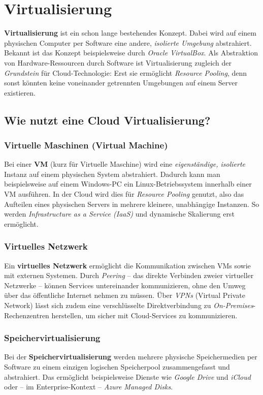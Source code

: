 \section{Virtualisierung}
\textbf{Virtualisierung} ist ein schon lange bestehendes Konzept. Dabei wird auf einem
physischen Computer per Software eine andere, \emph{isolierte Umgebung} abstrahiert.
Bekannt ist das Konzept beispielsweise durch \textit{Oracle VirtualBox}. Als Abstraktion
von Hardware-Ressourcen durch Software ist Virtualisierung zugleich der
\emph{Grundstein} für Cloud-Technologie: Erst sie ermöglicht \textit{Resource Pooling}, denn
sonst könnten keine voneinander getrennten Umgebungen auf einem Server
existieren.
\subsection{Wie nutzt eine Cloud Virtualisierung?}
\subsubsection{Virtuelle Maschinen (Virtual Machine)}
Bei einer \textbf{VM} (kurz für Virtuelle Maschine) wird eine \emph{eigenständige, isolierte}
Instanz auf einem physischen System abstrahiert. Dadurch kann man
beispielsweise auf einem Windows-PC ein Linux-Betriebssystem innerhalb einer VM
ausführen. In der Cloud wird dies für \textit{Resource Pooling} genutzt, also das
Aufteilen eines physischen Servers in mehrere kleinere, unabhängige Instanzen.
So werden \textit{Infrastructure as a Service (IaaS)} und dynamische Skalierung erst
ermöglicht.
\subsubsection{Virtuelles Netzwerk}
Ein \textbf{virtuelles Netzwerk} ermöglicht die Kommunikation zwischen VMs sowie mit
externen Systemen. Durch \textit{Peering} – das direkte Verbinden zweier virtueller
Netzwerke – können Services untereinander kommunizieren, ohne den Umweg über
das öffentliche Internet nehmen zu müssen. Über \textit{VPNs} (Virtual Private Network)
lässt sich zudem eine verschlüsselte Direktverbindung zu
\textit{On-Premises}-Rechenzentren herstellen, um sicher mit Cloud-Services zu
kommunizieren.
\subsubsection{Speichervirtualisierung}
Bei der \textbf{Speichervirtualisierung} werden mehrere physische Speichermedien per
Software zu einem einzigen logischen Speicherpool zusammengefasst und
abstrahiert. Das ermöglicht beispielsweise Dienste wie \textit{Google Drive} und \textit{iCloud}
oder – im Enterprise-Kontext – \textit{Azure Managed Disks}.

